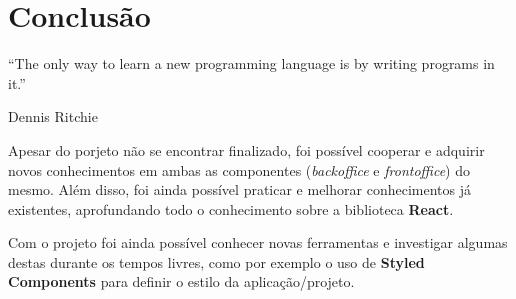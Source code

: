 \chapter{Conclusão}

\begin{flushright}
	\begin{quotebox50}
		\large
		“The only way to learn a new programming language is by writing programs in it.”

		\tcblower
		Dennis Ritchie
	\end{quotebox50}
\end{flushright}

Apesar do porjeto não se encontrar finalizado, foi possível cooperar e adquirir novos conhecimentos em ambas as componentes (\textit{backoffice} e \textit{frontoffice}) do mesmo. Além disso, foi ainda possível praticar e melhorar conhecimentos já existentes, aprofundando todo o conhecimento sobre a biblioteca \textbf{React}.

Com o projeto foi ainda possível conhecer novas ferramentas e investigar algumas destas durante os tempos livres, como por exemplo o uso de \textbf{Styled Components} para definir o estilo da aplicação/projeto.



